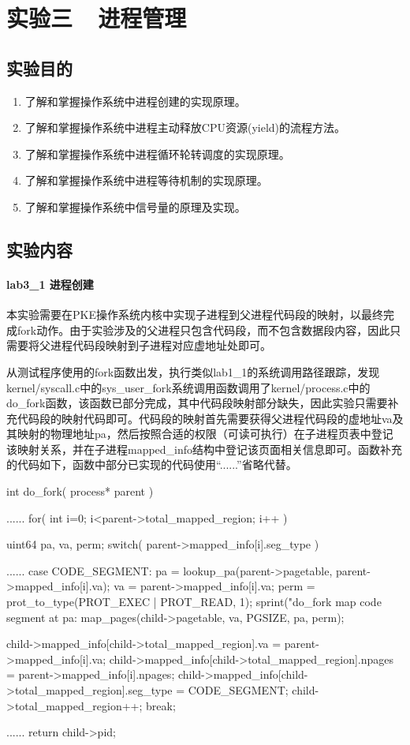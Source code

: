 \section{实验三\ \ 进程管理}

\subsection{实验目的}
\begin{enumerate}
    \item 了解和掌握操作系统中进程创建的实现原理。
    \item 了解和掌握操作系统中进程主动释放CPU资源(yield)的流程方法。
    \item 了解和掌握操作系统中进程循环轮转调度的实现原理。
    \item 了解和掌握操作系统中进程等待机制的实现原理。
    \item 了解和掌握操作系统中信号量的原理及实现。
\end{enumerate}

\subsection{实验内容}
\paragraph{lab3_1 进程创建} 本实验需要在PKE操作系统内核中实现子进程到父进程代码段的映射，以最终完成fork动作。由于实验涉及的父进程只包含代码段，而不包含数据段内容，因此只需要将父进程代码段映射到子进程对应虚地址处即可。

从测试程序使用的fork函数出发，执行类似lab1_1的系统调用路径跟踪，发现kernel/syscall.c中的sys_user_fork系统调用函数调用了kernel/process.c中的do_fork函数，该函数已部分完成，其中代码段映射部分缺失，因此实验只需要补充代码段的映射代码即可。代码段的映射首先需要获得父进程代码段的虚地址va及其映射的物理地址pa，然后按照合适的权限（可读可执行）在子进程页表中登记该映射关系，并在子进程mapped_info结构中登记该页面相关信息即可。函数补充的代码如下，函数中部分已实现的代码使用“......”省略代替。
\begin{cppcode}
int do_fork( process* parent ) {
  ......
  for( int i=0; i<parent->total_mapped_region; i++ ){
    uint64 pa, va, perm;
    switch( parent->mapped_info[i].seg_type ){
      ......
      case CODE_SEGMENT:
        pa = lookup_pa(parent->pagetable, parent->mapped_info[i].va);
        va = parent->mapped_info[i].va;
        perm = prot_to_type(PROT_EXEC | PROT_READ, 1);
        sprint("do_fork map code segment at pa:%
        map_pages(child->pagetable, va, PGSIZE, pa, perm); 
        
        child->mapped_info[child->total_mapped_region].va = parent->mapped_info[i].va;
        child->mapped_info[child->total_mapped_region].npages = 
        parent->mapped_info[i].npages;
        child->mapped_info[child->total_mapped_region].seg_type = CODE_SEGMENT;
        child->total_mapped_region++;
        break;
    }
  }
  ......
  return child->pid;
}
\end{cppcode}
